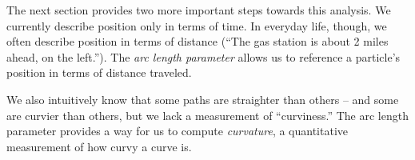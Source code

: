 The next section provides two more important steps towards this analysis. %
We currently describe position only in terms of time. In everyday life, though, we often describe position in terms of distance (``The gas station is about 2 miles ahead, on the left.''). The \emph{arc length parameter} allows us to reference a particle's position in terms of distance traveled. 

We also intuitively know that some paths are straighter than others -- and some are curvier than others, but we lack a measurement of ``curviness.'' The arc length parameter provides a way for us to compute \emph{curvature}, a quantitative measurement of how curvy a curve is.

